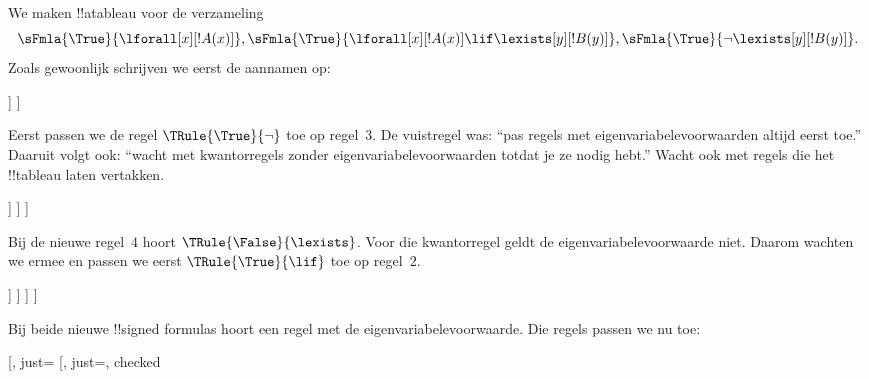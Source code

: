 \documentclass[openany]{memoir}
\begin{document}
\begin{ex}
We maken !!a{tableau} voor de verzameling
\[
\sFmla{\True}{\lforall[x][!A(x)]}, \sFmla{\True}{\lforall[x][!A(x)] 
  \lif \lexists[y][!B(y)]}, \sFmla{\True}{\lnot\lexists[y][!B(y)]}.
\]
Zoals gewoonlijk schrijven we eerst de aannamen op:
\begin{oltableau}
  [\sFmla{\True}{\lforall[x][\formula{A}(x)]}, just=\TAss
    [\sFmla{\True}{\lforall[x][\formula{A}(x)] \lif
        \lexists[y][\formula{B}(y)]}, just=\TAss
      [\sFmla{\True}{\lnot\lexists[y][\formula{B}(y)]}, just=\TAss
      ]
    ]
  ]
\end{oltableau}
Eerst passen we de regel $\TRule{\True}{\lnot}$ toe op regel~$3$. De
vuistregel was: ``pas regels met eigenvariabelevoorwaarden altijd eerst
toe.'' Daaruit volgt ook: ``wacht met kwantorregels zonder
eigenvariabelevoorwaarden totdat je ze nodig hebt.'' Wacht ook met
regels die het !!{tableau} laten vertakken.
\begin{oltableau}
  [\sFmla{\True}{\lforall[x][\formula{A}(x)]}, just=\TAss
    [\sFmla{\True}{\lforall[x][\formula{A}(x)] \lif
        \lexists[y][\formula{B}(y)]}, just=\TAss
      [\sFmla{\True}{\lnot\lexists[y][\formula{B}(y)]}, just=\TAss, checked
        [\sFmla{\False}{\lexists[y][\formula{B}(y)]}, just={\TRule{\True}{\lnot}[3]}]
      ]
    ]
  ]
\end{oltableau}
Bij de nieuwe regel~$4$ hoort $\TRule{\False}{\lexists}$. Voor die
kwantorregel geldt de eigenvariabelevoorwaarde niet. Daarom wachten we
ermee en passen we eerst $\TRule{\True}{\lif}$ toe op regel~$2$.
\begin{oltableau}
  [\sFmla{\True}{\lforall[x][\formula{A}(x)]}, just=\TAss
    [\sFmla{\True}{\lforall[x][\formula{A}(x)] \lif
        \lexists[y][\formula{B}(y)]}, just=\TAss, checked
      [\sFmla{\True}{\lnot\lexists[y][\formula{B}(y)]}, just=\TAss, checked
        [\sFmla{\False}{\lexists[y][\formula{B}(y)]},
          just={\TRule{\True}{\lnot}[3]},
          [\sFmla{\False}{\lforall[x][\formula{A}(x)]}, just={\TRule{\True}{\lif}[2]}]
          [\sFmla{\True}{\lexists[y][\formula{B}(y)]}, just={\TRule{\True}{\lif}[2]}]
        ]
      ]
    ]
  ]
\end{oltableau}
Bij beide nieuwe !!{signed formula}s hoort een regel met de
eigenvariabelevoorwaarde. Die regels passen we nu toe:
\begin{oltableau}
  [\sFmla{\True}{\lforall[x][\formula{A}(x)]}, just=\TAss
    [\sFmla{\True}{\lforall[x][\formula{A}(x)] \lif
        \lexists[y][\formula{B}(y)]}, just=\TAss, checked

\end{oltableau}
\end{ex}
\end{document}
